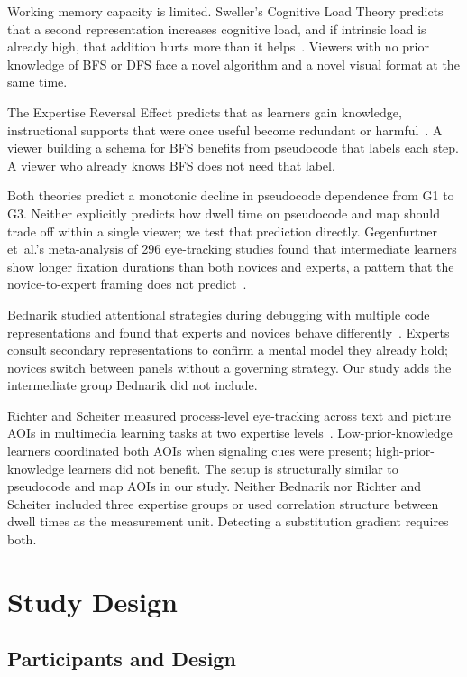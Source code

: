 \documentclass[journal]{vgtc}
\begin{document}
Working memory capacity is limited. Sweller's Cognitive Load Theory predicts
that a second representation increases cognitive load, and if intrinsic load
is already high, that addition hurts more than it
helps~\cite{Sweller1988Cognitive,Sweller1994Cognitive}. Viewers with no prior
knowledge of BFS or DFS face a novel algorithm and a novel visual format at
the same time.

The Expertise Reversal Effect predicts that as learners gain knowledge,
instructional supports that were once useful become redundant or
harmful~\cite{Kalyuga2003Expertise}. A viewer building a schema for BFS
benefits from pseudocode that labels each step. A viewer who already knows BFS
does not need that label.

Both theories predict a monotonic decline in pseudocode dependence from G1
to G3. Neither explicitly predicts how dwell time on pseudocode and map
should trade off within a single viewer; we test that prediction directly.
Gegenfurtner et~al.'s meta-analysis of 296 eye-tracking studies found that
intermediate learners show longer fixation durations than both novices and
experts, a pattern that the novice-to-expert framing does not
predict~\cite{Gegenfurtner2011Expertise}.

Bednarik studied attentional strategies during debugging with multiple code
representations and found that experts and novices behave
differently~\cite{Bednarik2012Expertise}. Experts consult secondary
representations to confirm a mental model they already hold; novices switch
between panels without a governing strategy. Our study adds the intermediate
group Bednarik did not include.

Richter and Scheiter measured process-level eye-tracking across text and
picture AOIs in multimedia learning tasks at two expertise
levels~\cite{Richter2019Studying}. Low-prior-knowledge learners coordinated
both AOIs when signaling cues were present; high-prior-knowledge learners did
not benefit. The setup is structurally similar to pseudocode and map AOIs in
our study.
Neither Bednarik nor Richter and Scheiter included three expertise groups or
used correlation structure between dwell times as the measurement unit.
Detecting a substitution gradient requires both.


\section{Study Design}

\subsection{Participants and Design}
\end{document}
